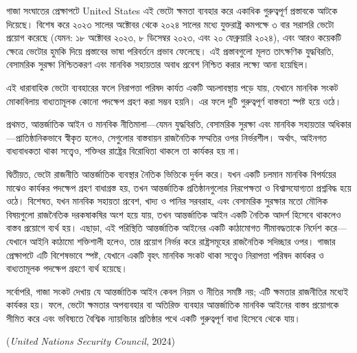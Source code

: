 গাজা সংঘাতের প্রেক্ষাপটে United States এই ভেটো ক্ষমতা ব্যবহার করে একাধিক
গুরুত্বপূর্ণ প্রস্তাবকে আটকে দিয়েছে। বিশেষ করে ২০২৩ সালের অক্টোবর থেকে ২০২৪
সালের মধ্যে যুক্তরাষ্ট্র কমপক্ষে ৩ বার সরাসরি ভেটো প্রয়োগ করেছে (যেমন: ১৮
অক্টোবর ২০২৩, ৮ ডিসেম্বর ২০২৩, এবং ২০ ফেব্রুয়ারি ২০২৪), এবং আরও কয়েকটি
ক্ষেত্রে ভেটোর হুমকি দিয়ে প্রস্তাবের ভাষা পরিবর্তনে প্রভাব ফেলেছে। এই প্রস্তাবগুলো
মূলত তাৎক্ষণিক যুদ্ধবিরতি, বেসামরিক সুরক্ষা নিশ্চিতকরণ এবং মানবিক সহায়তার অবাধ
প্রবেশ নিশ্চিত করার লক্ষ্যে আনা হয়েছিল।

এই ধারাবাহিক ভেটো ব্যবহারের ফলে নিরাপত্তা পরিষদ কার্যত একটি অচলাবস্থায় পড়ে
যায়, যেখানে মানবিক সংকট মোকাবিলায় বাধ্যতামূলক কোনো পদক্ষেপ গ্রহণ করা সম্ভব
হয়নি। এর ফলে দুটি গুরুত্বপূর্ণ বাস্তবতা স্পষ্ট হয়ে ওঠে।

প্রথমত, আন্তর্জাতিক আইন ও মানবিক নীতিমালা---যেমন যুদ্ধবিরতি, বেসামরিক সুরক্ষা
এবং মানবিক সহায়তার অধিকার---প্রাতিষ্ঠানিকভাবে স্বীকৃত হলেও, সেগুলোর বাস্তবায়ন
রাজনৈতিক সম্মতির ওপর নির্ভরশীল। অর্থাৎ, আইনগত বাধ্যবাধকতা থাকা সত্ত্বেও,
শক্তিধর রাষ্ট্রের বিরোধিতা থাকলে তা কার্যকর হয় না।

দ্বিতীয়ত, ভেটো রাজনীতি আন্তর্জাতিক ব্যবস্থার নৈতিক ভিত্তিকে দুর্বল করে। যখন একটি
চলমান মানবিক বিপর্যয়ের মাঝেও কার্যকর পদক্ষেপ গ্রহণ বাধাগ্রস্ত হয়, তখন
আন্তর্জাতিক প্রতিষ্ঠানগুলোর নিরপেক্ষতা ও বিশ্বাসযোগ্যতা প্রশ্নবিদ্ধ হয়ে ওঠে।
বিশেষত, যখন মানবিক সহায়তা প্রবেশ, খাদ্য ও পানির সরবরাহ, এবং বেসামরিক
সুরক্ষার মতো মৌলিক বিষয়গুলো রাজনৈতিক দরকষাকষির অংশ হয়ে যায়, তখন আন্তর্জাতিক
আইন একটি নৈতিক আদর্শ হিসেবে থাকলেও বাস্তব প্রয়োগে ব্যর্থ হয়। এছাড়া, এই
পরিস্থিতি আন্তর্জাতিক আইনের একটি কাঠামোগত সীমাবদ্ধতাকে নির্দেশ করে---যেখানে
আইনি কাঠামো শক্তিশালী হলেও, তার প্রয়োগ নির্ভর করে রাষ্ট্রসমূহের রাজনৈতিক
সদিচ্ছার ওপর। গাজার প্রেক্ষাপটে এটি বিশেষভাবে স্পষ্ট, যেখানে একটি বৃহৎ মানবিক
সংকট থাকা সত্ত্বেও নিরাপত্তা পরিষদ কার্যকর ও বাধ্যতামূলক পদক্ষেপ গ্রহণে ব্যর্থ
হয়েছে।

সর্বোপরি, গাজা সংকট দেখায় যে আন্তর্জাতিক আইন কেবল নিয়ম ও নীতির সমষ্টি নয়;
এটি ক্ষমতার রাজনীতির মধ্যেই কার্যকর হয়। ফলে, ভেটো ক্ষমতার অপব্যবহার বা
অতিরিক্ত ব্যবহার আন্তর্জাতিক মানবিক আইনের বাস্তব প্রয়োগকে সীমিত করে এবং
ভবিষ্যতে বৈশ্বিক ন্যায়বিচার প্রতিষ্ঠার পথে একটি গুরুত্বপূর্ণ বাধা হিসেবে থেকে যায়।

(\emph{United Nations Security Council}, 2024)

\vspace{0.3em}

